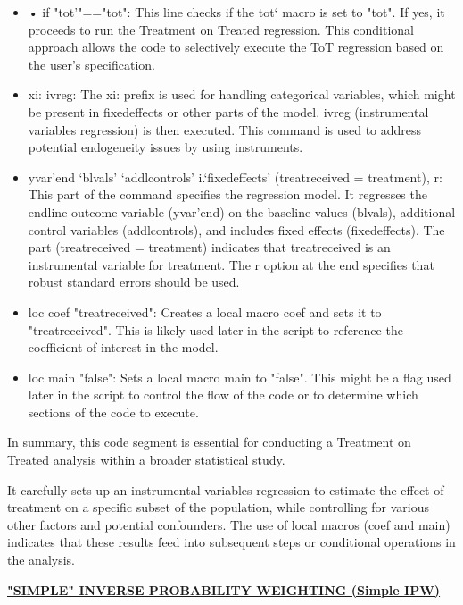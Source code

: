 \documentclass{article}
\begin{document}
\begin{itemize}
    \item •	if "tot'"=="tot": This line checks if the tot` macro is set to "tot". If yes, it proceeds to run the Treatment on Treated regression. This conditional approach allows the code to selectively execute the ToT regression based on the user's specification.
   \item xi: ivreg: The xi: prefix is used for handling categorical variables, which might be present in fixedeffects or other parts of the model. ivreg (instrumental variables regression) is then executed. This command is used to address potential endogeneity issues by using instruments.
   \item yvar'end `blvals' `addlcontrols' i.`fixedeffects' (treatreceived = treatment), r: This part of the command specifies the regression model. It regresses the endline outcome variable (yvar'end) on the baseline values (blvals), additional control variables (addlcontrols), and includes fixed effects (fixedeffects). The part (treatreceived = treatment) indicates that treatreceived is an instrumental variable for treatment. The r option at the end specifies that robust standard errors should be used.
   \item loc coef "treatreceived": Creates a local macro coef and sets it to "treatreceived". This is likely used later in the script to reference the coefficient of interest in the model.
   \item loc main "false": Sets a local macro main to "false". This might be a flag used later in the script to control the flow of the code or to determine which sections of the code to execute.
\end{itemize}

\vspace{0.3cm} In summary, this code segment is essential for conducting a Treatment on Treated analysis within a broader statistical study. \newline

It carefully sets up an instrumental variables regression to estimate the effect of treatment on a specific subset of the population, while controlling for various other factors and potential confounders. 
The use of local macros (coef and main) indicates that these results feed into subsequent steps or conditional operations in the analysis.\newline

\underline{\textbf{"SIMPLE" INVERSE PROBABILITY WEIGHTING (Simple IPW)}}
\end{document}
